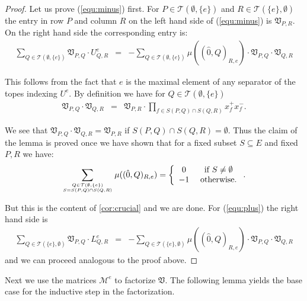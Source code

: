 \documentclass[12pt]{amsart}
\def\Var{{\mathfrak V}}
\def\Tscr{{\mathcal T}}
\theoremstyle{plain}
\numberwithin{Lemma}{\DefaultNumberTheoremWithin}
\numberwithin{Claim}{\DefaultNumberTheoremWithin}
\numberwithin{Theorem}{\DefaultNumberTheoremWithin}
\numberwithin{Corollary}{\DefaultNumberTheoremWithin}
\numberwithin{Proposition}{\DefaultNumberTheoremWithin}
\numberwithin{Conjecture}{\DefaultNumberTheoremWithin}
\numberwithin{Situation}{\DefaultNumberTheoremWithin}
\numberwithin{Note}{\DefaultNumberTheoremWithin}
\theoremstyle{definition}
\numberwithin{Definition}{\DefaultNumberTheoremWithin}
\theoremstyle{definition}
\numberwithin{Question}{\DefaultNumberTheoremWithin}
\theoremstyle{definition}
\numberwithin{Problem}{\DefaultNumberTheoremWithin}
\theoremstyle{remark} \newtheorem{Remark}{Remark}
\numberwithin{Remark}{\DefaultNumberTheoremWithin}
\theoremstyle{remark}
\numberwithin{Example}{\DefaultNumberTheoremWithin}
\numberwithin{Case}{Lemma}
\numberwithin{Step}{Lemma}
\begin{document}
\begin{proof}
Let us prove (\ref{equ:minus}) first. For $P \in \Tscr(\emptyset,\{e\})$ and $R \in \Tscr(\{e\},\emptyset)$ the entry in row $P$ and
  column $R$ on the left hand side of (\ref{equ:minus}) is 
  $\Var_{P,R}$. On the right hand side the corresponding entry is:
  \begin{eqnarray*} 
     \sum_{Q \in \Tscr(\emptyset,\{e\})} \Var_{P,Q} \cdot U^e_{Q,R} & = & - \sum_{Q \in \Tscr(\emptyset,\{e\})} \mu((\hat{0},Q)_{R,e}) \cdot  \Var_{P,Q} \cdot \Var_{Q,R} 
  \end{eqnarray*} 

  This follows from the fact that $e$ is the maximal element of any separator of the topes indexing $U^e$. By definition we have for $Q \in \Tscr(\emptyset,\{e\})$ 
  \begin{eqnarray*}
    \Var_{P,Q} \cdot \Var_{Q,R} & = & \Var_{P,R} \cdot \prod_{f \in S(P,Q) \cap S(Q,R)} x_{f}^+ x_{f}^-.
  \end{eqnarray*}

We see that $ \Var_{P,Q} \cdot \Var_{Q,R}  =  \Var_{P,R}$ if $S(P,Q) \cap S(Q,R)=\emptyset$. Thus the claim of the lemma is proved once we have shown that for a fixed subset $S \subseteq E$ 
  and fixed $P,R$ we have:
  \begin{eqnarray}
     \label{eq:mueq}
     \sum_{\genfrac{}{}{0pt}{}{Q \in \Tscr(\emptyset,\{e\})}{ S= S(P,Q) \cap S(Q,R)}}  \mu((\hat{0},Q)_{R,e}) = \left\{ 
                \begin{array}{cc} 0 & \mbox{~if~} S\neq \emptyset \\
                                 -1 & \mbox{~otherwise.} 
                \end{array} \right. .
  \end{eqnarray}

  But this is the content of \ref{cor:crucial} and we are done. For (\ref{equ:plus}) the right hand side is
  \begin{align*}
  \sum_{Q \in \Tscr(\{e\},\emptyset)} \Var_{P,Q} \cdot L^e_{Q,R} & = & - \sum_{Q \in \Tscr(\{e\},\emptyset)} \mu((\hat{0},Q)_{R,e}) \cdot  \Var_{P,Q} \cdot \Var_{Q,R} 
  \end{align*}
and we can proceed analogous to the proof above.
\end{proof}

Next we use the matrices $\mathcal{M}^e$ to factorize $\Var$. 
The following lemma yields the base case for the inductive step in the 
factorization.
\end{document}
